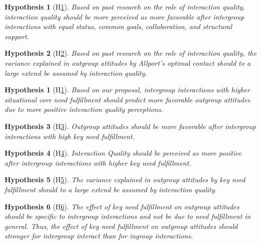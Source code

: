 \documentclass[man, 12pt, a4paper, mask]{apa7}
\theoremstyle{break}
\theoremstyle{plain}
\newtheorem{hyp}{Hypothesis}
\newtheorem{subhyp}{Hypothesis}
\begin{document}
\begin{subhyp}[H\ref{hyp:AllportsQuality}] \label{hyp:AllportsQuality}
\addtolength{\leftskip}{2.5em}
Based on past research on the role of interaction quality, interaction quality should be more perceived as more favorable after intergroup interactions with equal status, common goals, collaboration, and structural support.
\end{subhyp}

\begin{subhyp}[H\ref{hyp:AllportsQualityMediation}] \label{hyp:AllportsQualityMediation}
\addtolength{\leftskip}{2.5em}
Based on past research on the role of interaction quality, the variance explained in outgroup attitudes by Allport's optimal contact should to a large extend be assumed by interaction quality.
\end{subhyp}

\begin{hyp}[H\ref{hyp:keyNeed}] \label{hyp:keyNeed}
Based on our proposal, intergroup interactions with higher situational core need fulfillment should predict more favorable outgroup attitudes due to more positive interaction quality perceptions.
\end{hyp}

\setcounter{subhyp}{0}
\begin{subhyp}[H\ref{hyp:keyNeedPred}] \label{hyp:keyNeedPred}
\addtolength{\leftskip}{2.5em}
Outgroup attitudes should be more favorable after intergroup interactions with high key need fulfillment.
\end{subhyp}

\begin{subhyp}[H\ref{hyp:keyNeedQual}] \label{hyp:keyNeedQual}
\addtolength{\leftskip}{2.5em}
Interaction Quality should be perceived as more positive after intergroup interactions with higher key need fulfillment.
\end{subhyp}

\begin{subhyp}[H\ref{hyp:keyNeedMediation}] \label{hyp:keyNeedMediation}
\addtolength{\leftskip}{2.5em}
The variance explained in outgroup attitudes by key need fulfillment should to a large extend be assumed by interaction quality.
\end{subhyp}

\begin{subhyp}[H\ref{hyp:keyNeedContactType}] \label{hyp:keyNeedContactType}
\addtolength{\leftskip}{2.5em}
The effect of key need fulfillment on outgroup attitudes should be specific to intergroup interactions and not be due to need fulfillment in general. Thus, the effect of key need fulfillment on outgroup attitudes should stronger for intergroup interact than for ingroup interactions. 
\end{subhyp}
\end{document}
